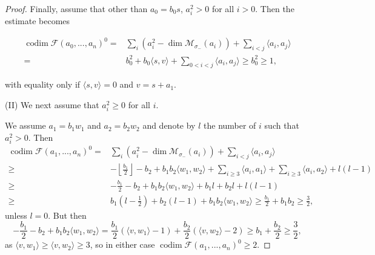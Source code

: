 \documentclass[leqno,11pt]{amsart}
\def\codim{\mathop{\mathrm{codim}}\nolimits}
\def\dim{\mathop{\mathrm{dim}}\nolimits}
\theoremstyle{definition}
\def\FF{\ensuremath{\mathcal F}}
\def\MM{\ensuremath{\mathcal M}}
\begin{document}
\begin{proof}
Finally, assume that other than $a_0=b_0 s$, $a_i^2>0$ for all $i>0$.  Then the estimate becomes 

\begin{equation}\label{eq: spherical 1,2 case I, d}
\begin{split}
\codim\FF(a_0,...,a_n)^0=&\sum_i (a_i^2-\dim \MM_{\sigma_-}(a_i))+\sum_{i<j}\langle a_i,a_j \rangle\\
= & b_0^2+b_0\langle s,v\rangle+\sum_{0<i<j}\langle a_i,a_j\rangle\geq b_0^2\geq 1,
\end{split}
\end{equation}

with equality only if $\langle s,v\rangle=0$ and $v=s+a_1$.  



(II) We next assume that $a_i^2 \geq 0$ for all $i$.
 

We assume $a_1=b_1 w_1$ and $a_2=b_2 w_2$ and denote by $l$ the number of $i$ such that $a_i^2>0$.
Then 
 \begin{equation}\label{eq: spherical 1,2 case II,a}
\begin{split}
\codim\FF(a_1,...,a_n)^0=& \sum_i (a_i^2-\dim \MM_{\sigma_-}(a_i))+\sum_{i<j}\langle a_i,a_j \rangle\\
\geq &
-\left\lfloor\frac{b_1}{2}\right\rfloor-b_2+b_1 b_2 \langle w_1,w_2 \rangle
+\sum_{i \geq 3} \langle a_i,a_1\rangle+\sum_{i\geq 3}\langle a_i,a_2 \rangle+l(l-1)\\
\geq & -\frac{b_1}{2}-b_2+b_1 b_2 \langle w_1,w_2 \rangle+b_1l+b_2l+l(l-1)\\
\geq & b_1(l-\frac{1}{2})+b_2(l-1)+b_1 b_2\langle w_1,w_2\rangle\geq\frac{b_1}{2}+b_1 b_2\geq \frac{3}{2},
\end{split}
\end{equation}
unless $l=0$.  But then $$-\frac{b_1}{2}-b_2+b_1 b_2\langle w_1,w_2\rangle=\frac{b_1}{2}(\langle v,w_1\rangle-1)+\frac{b_2}{2}(\langle v,w_2\rangle-2)\geq b_1+\frac{b_2}{2}\geq\frac{3}{2},$$ as $\langle v,w_1\rangle\geq\langle v,w_2\rangle\geq 3$, so in either case $\codim\FF(a_1,...,a_n)^0\geq 2$.



\end{proof}
\end{document}
